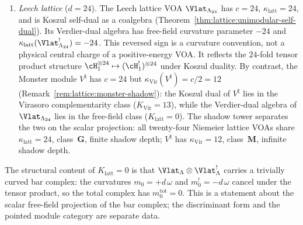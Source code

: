 \begin{remark}
\begin{enumerate}[label=\textup{(\roman*)}]
\item \emph{Leech lattice} ($d = 24$).
 The Leech lattice VOA
 $\Vlat_{\Lambda_{24}}$ has
 $c = 24$, $\kappa_{\mathrm{latt}} = 24$, and is Koszul
 self-dual as a coalgebra
 (Theorem~\ref{thm:lattice:unimodular-self-dual}).
 Its Verdier-dual algebra has free-field curvature parameter
 $-24$ and
 $\kappa_{\mathrm{latt}}(\Vlat_{\Lambda_{24}}^!) = -24$.
 This reversed sign is a curvature convention, not a physical
 central charge of a positive-energy VOA. It reflects the
 $24$-fold tensor product structure
 $\cH_1^{\otimes 24} \mapsto (\cH_1^!)^{\otimes 24}$
 under Koszul duality.
 By contrast, the Monster module $V^\natural$ has $c = 24$
 but $\kappa_{\mathrm{Vir}}(V^\natural) = c/2 = 12$
 (Remark~\ref{rem:lattice:monster-shadow}):
 the Koszul dual of $V^\natural$ lies in the Virasoro
 complementarity class ($K_{\mathrm{Vir}} = 13$), while
 the Verdier-dual algebra of $\Vlat_{\Lambda_{24}}$ lies in the
 free-field class ($K_{\mathrm{latt}} = 0$). The shadow
 tower separates the two on the scalar projection: all twenty-four
 Niemeier lattice
 VOAs share $\kappa_{\mathrm{latt}} = 24$, class~$\mathbf{G}$,
 finite shadow depth; $V^\natural$ has
 $\kappa_{\mathrm{Vir}} = 12$, class~$\mathbf{M}$,
 infinite shadow depth.
\end{enumerate}

The structural content of $K_{\mathrm{latt}} = 0$ is that
$\Vlat_\Lambda \otimes \Vlat_\Lambda^!$ carries a trivially
curved bar complex: the curvatures $m_0 = +d\,\omega$ and
$m_0^! = -d\,\omega$ cancel under the tensor product,
so the total complex has $m_0^{\mathrm{tot}} = 0$.
This is a statement about the scalar free-field projection of the
bar complex; the discriminant form and the pointed module category are
separate data.
\end{remark}

